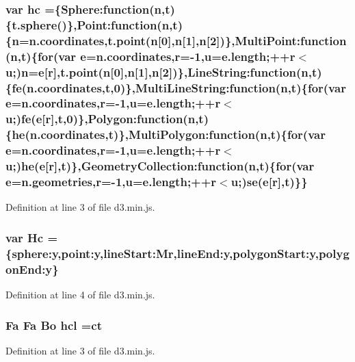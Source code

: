 \subsubsection[{hc}]{\setlength{\rightskip}{0pt plus 5cm}var hc =\{Sphere\+:function({\bf n},t)\{t.\+sphere()\},Point\+:function({\bf n},t)\{{\bf n}=n.\+coordinates,t.\+point({\bf n}[0],{\bf n}[1],{\bf n}[2])\},Multi\+Point\+:function({\bf n},t)\{{\bf for}(var {\bf e}=n.\+coordinates,{\bf r}=-\/1,u=e.\+length;++{\bf r}$<$u;){\bf n}={\bf e}[{\bf r}],t.\+point({\bf n}[0],{\bf n}[1],{\bf n}[2])\},Line\+String\+:function({\bf n},t)\{fe(n.\+coordinates,t,0)\},Multi\+Line\+String\+:function({\bf n},t)\{{\bf for}(var {\bf e}=n.\+coordinates,{\bf r}=-\/1,u=e.\+length;++{\bf r}$<$u;)fe({\bf e}[{\bf r}],t,0)\},Polygon\+:function({\bf n},t)\{he(n.\+coordinates,t)\},Multi\+Polygon\+:function({\bf n},t)\{{\bf for}(var {\bf e}=n.\+coordinates,{\bf r}=-\/1,u=e.\+length;++{\bf r}$<$u;)he({\bf e}[{\bf r}],t)\},Geometry\+Collection\+:function({\bf n},t)\{{\bf for}(var {\bf e}=n.\+geometries,{\bf r}=-\/1,u=e.\+length;++{\bf r}$<$u;)se({\bf e}[{\bf r}],t)\}\}}\label{d3_8min_8js_ab3315a874c536e9df95a651f8e709b2e}


Definition at line 3 of file d3.\+min.\+js.

\subsubsection[{Hc}]{\setlength{\rightskip}{0pt plus 5cm}var Hc =\{sphere\+:y,point\+:y,line\+Start\+:\+Mr,line\+End\+:y,polygon\+Start\+:y,polygon\+End\+:y\}}\label{d3_8min_8js_a481f971870244f93991f86fb619b2039}


Definition at line 4 of file d3.\+min.\+js.

\subsubsection[{hcl}]{ {\bf Fa} {\bf Fa} {\bf Bo} hcl =ct}\label{d3_8min_8js_a12dae84dc82e28e84cd65055fb120ca0}


Definition at line 3 of file d3.\+min.\+js.

